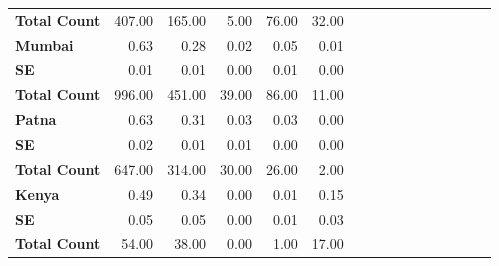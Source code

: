 \begin{tabular}{@{\extracolsep{5pt}}lrrrrrrrrrrrrrrr}
{\bf Total Count} & 407.00\phantom{***} & 165.00\phantom{***} & 5.00\phantom{***} & 76.00\phantom{***} & 32.00\phantom{***} \\
{\bf Mumbai} & 0.63\phantom{***} & 0.28\phantom{***} & 0.02\phantom{***} & 0.05\phantom{***} & 0.01\phantom{***} \\
{\bf SE} & 0.01\phantom{***} & 0.01\phantom{***} & 0.00\phantom{***} & 0.01\phantom{***} & 0.00\phantom{***} \\
{\bf Total Count} & 996.00\phantom{***} & 451.00\phantom{***} & 39.00\phantom{***} & 86.00\phantom{***} & 11.00\phantom{***} \\
{\bf Patna} & 0.63\phantom{***} & 0.31\phantom{***} & 0.03\phantom{***} & 0.03\phantom{***} & 0.00\phantom{***} \\
{\bf SE} & 0.02\phantom{***} & 0.01\phantom{***} & 0.01\phantom{***} & 0.00\phantom{***} & 0.00\phantom{***} \\
{\bf Total Count} & 647.00\phantom{***} & 314.00\phantom{***} & 30.00\phantom{***} & 26.00\phantom{***} & 2.00\phantom{***} \\
{\bf Kenya} & 0.49\phantom{***} & 0.34\phantom{***} & 0.00\phantom{***} & 0.01\phantom{***} & 0.15\phantom{***} \\
{\bf SE} & 0.05\phantom{***} & 0.05\phantom{***} & 0.00\phantom{***} & 0.01\phantom{***} & 0.03\phantom{***} \\
{\bf Total Count} & 54.00\phantom{***} & 38.00\phantom{***} & 0.00\phantom{***} & 1.00\phantom{***} & 17.00\phantom{***} \\
\hline
\end{tabular}
